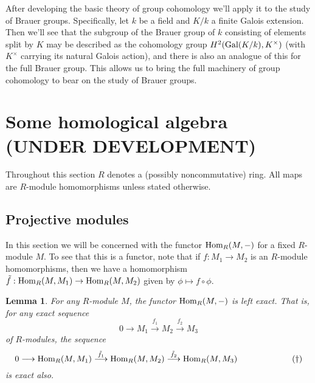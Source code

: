 \documentclass[11pt]{amsart}
\numberwithin{equation}{section}
\newtheorem{lemma}[equation]{Lemma}
\theoremstyle{remark}
\theoremstyle{remark}
\theoremstyle{remark}
\theoremstyle{definition}
\theoremstyle{definition}
\theoremstyle{definition}
\theoremstyle{definition}
\theoremstyle{definition}
\theoremstyle{definition}
\begin{document}
After developing the basic theory of group cohomology we'll apply it to the study of Brauer groups. Specifically, let $k$ be a field and $K/k$ a finite Galois extension. Then we'll see that the subgroup of the Brauer group of $k$ consisting of elements split by $K$ may be described as the cohomology group $H^2(\textup{Gal}(K/k),K^{\times})$ (with $K^\times$ carrying its natural Galois action), and there is also an analogue of this for the full Brauer group. This allows us to bring the full machinery of group cohomology to bear on the study of Brauer groups. %

\section{Some homological algebra (UNDER DEVELOPMENT)}

Throughout this section $R$ denotes a (possibly noncommutative) ring. All maps are $R$-module homomorphisms unless stated otherwise.



\subsection{Projective modules} \label{projective module section}

In this section we will be concerned with the functor $\textup{Hom}_R(M,-)$ for a fixed $R$-module $M$. To see that this is a functor, note that if $f:M_1\rightarrow M_2$ is an $R$-module homomorphisms, then we have a homomorphism $\tilde{f}:\textup{Hom}_R(M,M_1)\rightarrow \textup{Hom}_R(M,M_2)$ given by $\phi \mapsto f \circ \phi$.

\begin{lemma} \label{left exact hom}
For any $R$-module $M$, the functor $\textup{Hom}_R(M,-)$ is left exact. That is, for any exact sequence \[0\longrightarrow M_1\stackrel{f_1}{\longrightarrow} M_2 \stackrel{f_2}{\longrightarrow} M_3\] of $R$-modules, the sequence \[0\longrightarrow \textup{Hom}_R(M,M_1)\stackrel{\tilde{f}_1}{\longrightarrow} \textup{Hom}_R(M,M_2)\stackrel{\tilde{f}_2}{\longrightarrow} \textup{Hom}_R(M,M_3)\phantom{how do you do ag}(\dagger)\] is exact also. %
\end{lemma}
\end{document}
